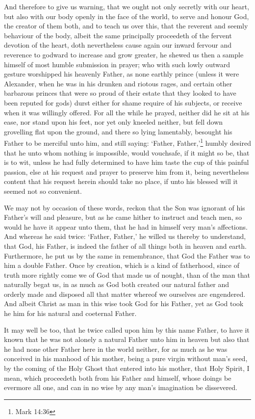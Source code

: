 \documentclass[a5paper]{scrbook}
\begin{document}
	And therefore to give us warning, that we ought not only secretly with our heart, but also with our body openly in the face of the world, to serve and honour God, the creator of them both, and to teach us over this, that the reverent and seemly behaviour of the body, albeit the same principally proceedeth of the fervent devotion of the heart, doth nevertheless cause again our inward fervour and reverence to godward to increase and grow greater, he shewed us then a sample himself of most humble submission in prayer; who with such lowly outward gesture worshipped his heavenly Father, as none earthly prince (unless it were Alexander, when he was in his drunken and riotous rages, and certain other barbarous princes that were so proud of their estate that they looked to have been reputed for gods) durst either for shame require of his subjects, or receive when it was willingly offered. For all the while he prayed, neither did he sit at his ease, nor stand upon his feet, nor yet only kneeled neither, but fell down grovelling flat upon the ground, and there so lying lamentably, besought his Father to be merciful unto him, and still saying: ‘Father, Father,’\footnote{Mark 14:36} humbly desired that he unto whom nothing is impossible, would vouchsafe, if it might so be, that is to wit, unless he had fully determined to have him taste the cup of this painful passion, else at his request and prayer to preserve him from it, being nevertheless content that his request herein should take no place, if unto his blessed will it seemed not so convenient.
	
	We may not by occasion of these words, reckon that the Son was ignorant of his Father's will and pleasure, but as he came hither to instruct and teach men, so would he have it appear unto them, that he had in himself very man's affections. And whereas he said twice: ‘Father, Father,’ he willed us thereby to understand, that God, his Father, is indeed the father of all things both in heaven and earth. Furthermore, he put us by the same in remembrance, that God the Father was to him a double Father. Once by creation, which is a kind of fatherhood, since of truth more rightly come we of God that made us of nought, than of the man that naturally begat us, in as much as God both created our natural father and orderly made and disposed all that matter whereof we ourselves are engendered. And albeit Christ as man in this wise took God for his Father, yet as God took he him for his natural and coeternal Father.
	
	It may well be too, that he twice called upon him by this name Father, to have it known that he was not alonely a natural Father unto him in heaven but also that he had none other Father here in the world neither, for as much as he was conceived in his manhood of his mother, being a pure virgin without man's seed, by the coming of the Holy Ghost that entered into his mother, that Holy Spirit, I mean, which proceedeth both from his Father and himself, whose doings be evermore all one, and can in no wise by any man's imagination be dissevered.
	
\end{document}
